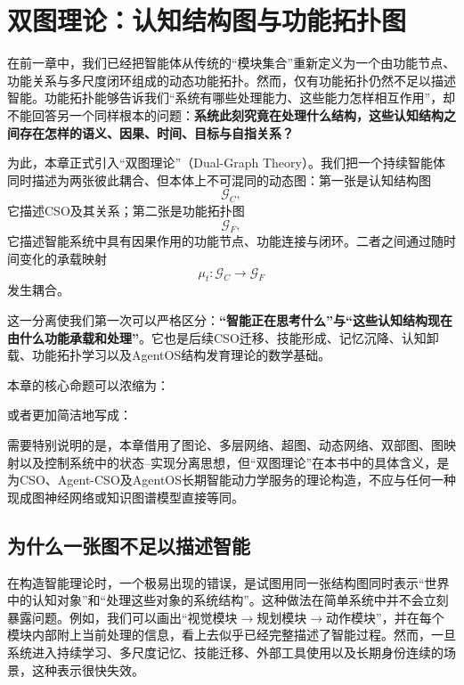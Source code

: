 \chapter{双图理论：认知结构图与功能拓扑图}

\begin{chapterlead}
在前一章中，我们已经把智能体从传统的“模块集合”重新定义为一个由功能节点、功能关系与多尺度闭环组成的动态功能拓扑。然而，仅有功能拓扑仍然不足以描述智能。功能拓扑能够告诉我们“系统有哪些处理能力、这些能力怎样相互作用”，却不能回答另一个同样根本的问题：\textbf{系统此刻究竟在处理什么结构，这些认知结构之间存在怎样的语义、因果、时间、目标与自指关系？}

为此，本章正式引入“双图理论”（Dual-Graph Theory）。我们把一个持续智能体同时描述为两张彼此耦合、但本体上不可混同的动态图：第一张是认知结构图
\[
\mathcal G_C,
\]
它描述CSO及其关系；第二张是功能拓扑图
\[
\mathcal G_F,
\]
它描述智能系统中具有因果作用的功能节点、功能连接与闭环。二者之间通过随时间变化的承载映射
\[
\mu_t:\mathcal G_C\rightarrow\mathcal G_F
\]
发生耦合。

这一分离使我们第一次可以严格区分：\textbf{“智能正在思考什么”与“这些认知结构现在由什么功能承载和处理”}。它也是后续CSO迁移、技能形成、记忆沉降、认知卸载、功能拓扑学习以及AgentOS结构发育理论的数学基础。

本章的核心命题可以浓缩为：
\begin{statementbox}
\centering
{}
\end{statementbox}
或者更加简洁地写成：
\begin{statementbox}
\centering
{}
\end{statementbox}

需要特别说明的是，本章借用了图论、多层网络、超图、动态网络、双部图、图映射以及控制系统中的状态--实现分离思想，但“双图理论”在本书中的具体含义，是为CSO、Agent-CSO及AgentOS长期智能动力学服务的理论构造，不应与任何一种现成图神经网络或知识图谱模型直接等同。
\end{chapterlead}


\section{为什么一张图不足以描述智能}

在构造智能理论时，一个极易出现的错误，是试图用同一张结构图同时表示“世界中的认知对象”和“处理这些对象的系统结构”。这种做法在简单系统中并不会立刻暴露问题。例如，我们可以画出“视觉模块$\rightarrow$规划模块$\rightarrow$动作模块”，并在每个模块内部附上当前处理的信息，看上去似乎已经完整描述了智能过程。然而，一旦系统进入持续学习、多尺度记忆、技能迁移、外部工具使用以及长期身份连续的场景，这种表示很快失效。

